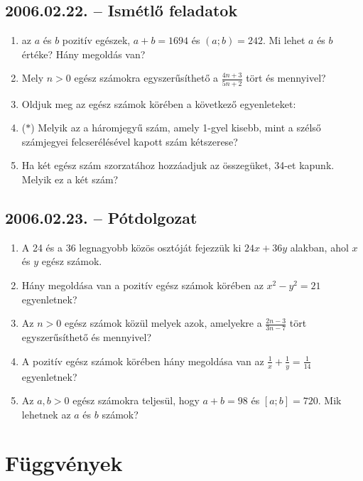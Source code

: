 \subsection*{2006.02.22. -- Ismétlő feladatok}
\begin{enumerate}
\item az $a$ és $b$ pozitív egészek, $a+b=1694$ és 
$(a;b)=242$. Mi lehet $a$ és $b$ értéke? Hány megoldás van?
\item Mely $n>0$ egész számokra egyszerűsíthető a 
$\frac{4n+3}{5n+2}$ tört és mennyivel?
\item Oldjuk meg az egész számok körében a következő egyenleteket:
\item ($*$) Melyik az a háromjegyű szám, amely 1-gyel kisebb, mint a szélső számjegyei felcserélésével kapott szám kétszerese?
\item Ha két egész szám szorzatához hozzáadjuk az összegüket, 34-et kapunk. Melyik ez a két szám?
\end{enumerate}

\subsection*{2006.02.23. -- Pótdolgozat}
\begin{enumerate}
\item A 24 és a 36 legnagyobb közös osztóját fejezzük ki $24x+36y$ alakban, ahol $x$ és $y$ egész számok.
\item Hány megoldása van a pozitív egész számok körében az $x^2-y^2=21$ egyenletnek?
\item Az $n>0$ egész számok közül melyek azok, amelyekre a $\frac{2n-3}{3n-7}$ tört egyszerűsíthető és mennyivel?
\item A pozitív egész számok körében hány megoldása van az $\frac{1}{x}+\frac{1}{y}=\frac{1}{14}$
egyenletnek?
\item Az $a,b>0$ egész számokra teljesül, hogy $a+b=98$ és $[a;b]=720$. Mik lehetnek az $a$ és $b$ számok?
\end{enumerate}

\section{Függvények}


